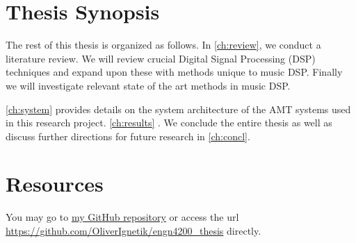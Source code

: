 \lipsum[1]

\section{Thesis Synopsis}

The rest of this thesis is organized as follows. In \autoref{ch:review}, we
conduct a literature review. We will review crucial Digital Signal Processing
(DSP) techniques and expand upon these with methods unique to music DSP. Finally
we will investigate relevant state of the art methods in music DSP.

\autoref{ch:system} provides details on the system architecture of the AMT
systems used in this research project. \autoref{ch:results} . We conclude the
entire thesis as well as discuss further directions for future research in
\autoref{ch:concl}.

\section{Resources}

You may go to \href{https://github.com/OliverIgnetik/engn4200_thesis}{my GitHub
    repository} or access the url
\url{https://github.com/OliverIgnetik/engn4200_thesis} directly.

